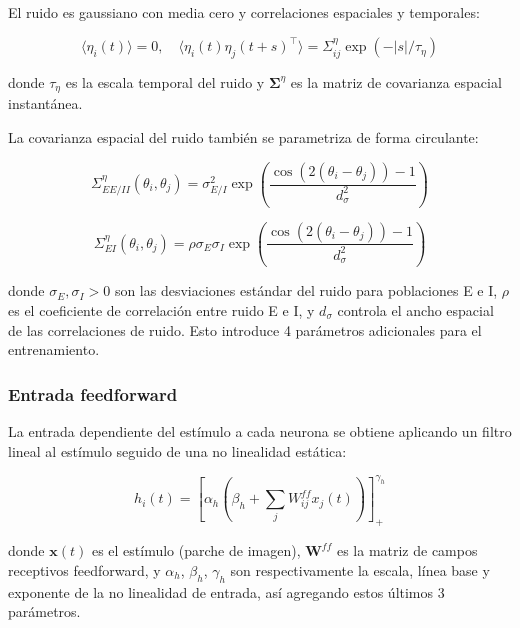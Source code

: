 El ruido es gaussiano con media cero y correlaciones espaciales y temporales:

\begin{equation}
\langle \eta_i(t) \rangle = 0, \quad \langle \eta_i(t) \eta_j(t+s)^\top \rangle = \Sigma_{ij}^\eta \exp(-|s|/\tau_\eta)
\label{eq:noise_correlation}
\end{equation}

donde $\tau_\eta$ es la escala temporal del ruido y $\boldsymbol{\Sigma}^\eta$ es la matriz de covarianza espacial instantánea.

La covarianza espacial del ruido también se parametriza de forma circulante:

\begin{equation}
\Sigma_{EE/II}^\eta(\theta_i, \theta_j) = \sigma_{E/I}^2 \exp\left( \frac{\cos(2(\theta_i - \theta_j)) - 1}{d_\sigma^2} \right)
\label{eq:noise_cov_same}
\end{equation}

\begin{equation}
\Sigma_{EI}^\eta(\theta_i, \theta_j) = \rho \sigma_E \sigma_I \exp\left( \frac{\cos(2(\theta_i - \theta_j)) - 1}{d_\sigma^2} \right)
\label{eq:noise_cov_cross}
\end{equation}

donde $\sigma_E, \sigma_I > 0$ son las desviaciones estándar del ruido para poblaciones E e I, $\rho$ es el coeficiente de correlación entre ruido E e I, y $d_\sigma$ controla el ancho espacial de las correlaciones de ruido. Esto introduce 4 parámetros adicionales para el entrenamiento.

\subsubsection{Entrada feedforward}

La entrada dependiente del estímulo a cada neurona se obtiene aplicando un filtro lineal al estímulo seguido de una no linealidad estática:

\begin{equation}
h_i(t) = \left[ \alpha_h \left( \beta_h + \sum_j W_{ij}^{ff} x_j(t) \right) \right]_+^{\gamma_h}
\label{eq:feedforward_input}
\end{equation}

donde $\mathbf{x}(t)$ es el estímulo (parche de imagen), $\mathbf{W}^{ff}$ es la matriz de campos receptivos feedforward, y $\alpha_h$, $\beta_h$, $\gamma_h$ son respectivamente la escala, línea base y exponente de la no linealidad de entrada, así agregando estos últimos 3 parámetros.


